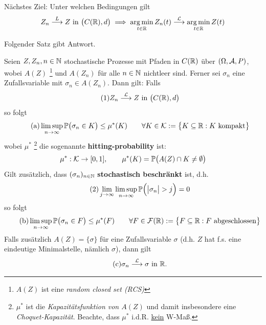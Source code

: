 Nächstes Ziel: Unter welchen Bedingungen gilt
\begin{align*}
	Z_n\overset{L}{\longrightarrow}Z\text{ in }\big(C(\R),d\big)
	\implies\argmin\limits_{t\in\R}Z_n(t)\overset{\L}{\longrightarrow}\argmin\limits_{t\in\R}Z(t)
\end{align*}

Folgender Satz gibt Antwort.

\begin{satz}\label{satz8.9}
	Seien $Z,Z_n,n\in\N$ stochastische Prozesse mit Pfaden in $C(\R)$ über $(\Omega,\A,P)$,
	wobei $A(Z)$ 
	\footnote{$A(Z)$ ist eine \textit{random closed set (RCS)}} 
	und $A(Z_n)$ für alle $n\in\N$ nichtleer sind.
	Ferner sei $\sigma_n$ eine Zufallsvariable mit $\sigma_n\in A(Z_n)$.
	Dann gilt: Falls
	\begin{align}\label{eqSatz8.9_1}\tag{1}
		Z_n\overset{\L}{\longrightarrow} Z\text{ in }\big(C(\R),d\big)
	\end{align}
	so folgt
	\begin{align}\label{eqSatz8.9_a}\tag{a}
		\limsup\limits_{n\to\infty}\P\big(\sigma_n\in K\big)\leq\mu^\ast(K)\qquad\forall K\in\mathcal{K}:=\big\lbrace K\subseteq\R:K\text{ kompakt}\big\rbrace
	\end{align}
	wobei $\mu^\ast$
	\footnote{$\mu^\ast$ ist die \textit{Kapazitätsfunktion von $A(Z)$} und damit insbesondere eine \textit{Choquet-Kapazität}.
	Beachte, dass $\mu^\ast$ i.d.R. \underline{kein} W-Maß.}	
	die sogenannte \textbf{hitting-probability} ist:
	\begin{align*}
		\mu^\ast:\mathcal{K}\to[0,1],\qquad
		\mu^\ast(K)=\P\big(A(Z)\cap K\neq\emptyset\big)
	\end{align*}
	Gilt zusätzlich, dass $(\sigma_n)_{n\in\N}$ \textbf{stochastisch beschränkt} ist, d.h. 
	\begin{align}\label{eqSatz8.9_2}\tag{2}
		\lim\limits_{j\to\infty}\limsup\limits_{n\to\infty}\P\Big(\big|\sigma_n\big|>j\Big)=0
	\end{align}
	so folgt
	\begin{align}\label{eqSatz8.9_b}\tag{b}
		\limsup\limits_{n\to\infty}\P\big(\sigma_n\in F\big)\leq\mu^\ast(F)\qquad\forall F\in\F(\R):=\big\lbrace F\subseteq\R:F\text{ abgeschlossen}\big\rbrace
	\end{align}
	Falls zusätzlich $A(Z)=\lbrace\sigma\rbrace$ für eine Zufallsvariable $\sigma$
	(d.h. $Z$ hat f.s. eine eindeutige Minimalstelle, nämlich $\sigma$), dann gilt
	\begin{align}\label{eqSatz8.9_c}\tag{c}
		\sigma_n\overset{\L}{\longrightarrow}\sigma\text{ in }\R.
	\end{align}
\end{satz}

